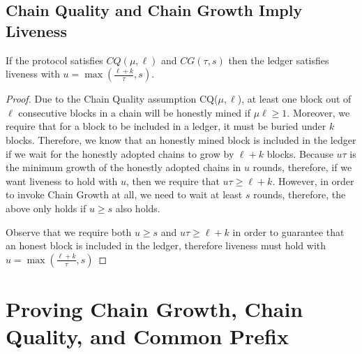 



\subsection{Chain Quality and Chain Growth Imply Liveness}

\begin{theorem} If the protocol satisfies $CQ(\mu, \ell)$ and $CG(\tau,s)$ then the ledger satisfies liveness with $u = \max(\frac{\ell + k}{\tau}, s)$.
\end{theorem}

\begin{proof}
Due to the Chain Quality assumption CQ($\mu,\ell$), at least one block out of $\ell$ consecutive blocks in a chain will be honestly mined if $\mu \ell \geq 1$. Moreover, we require that for a block to be included in a ledger, it must be buried under $k$ blocks. Therefore, we know that an honestly mined block is included in the ledger if we wait for the honestly adopted chains to grow by $\ell + k$ blocks. Because $u\tau$ is the minimum growth of the honestly adopted chains in $u$ rounds, therefore, if we want liveness to hold with $u$, then we require that $u\tau \geq \ell+k$. However, in order to invoke Chain Growth at all, we need to wait at least $s$ rounds, therefore, the above only holds if $u \geq s$ also holds.

Observe that we require both $u \geq s$ and $u\tau \geq \ell + k$ in order to guarantee that an honest block is included in the ledger, therefore liveness must hold with $u = \max(\frac{\ell+k}{\tau}, s)$
\end{proof}

\section{Proving Chain Growth, Chain Quality, and Common Prefix}

